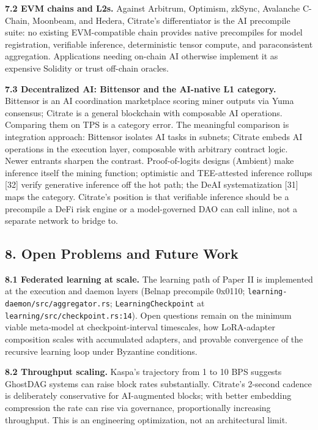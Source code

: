 \textbf{7.2 EVM chains and L2s.} Against Arbitrum, Optimism, zkSync,
Avalanche C-Chain, Moonbeam, and Hedera, Citrate's differentiator is the
AI precompile suite: no existing EVM-compatible chain provides native
precompiles for model registration, verifiable inference, deterministic
tensor compute, and paraconsistent aggregation. Applications needing
on-chain AI otherwise implement it as expensive Solidity or trust
off-chain oracles.

\textbf{7.3 Decentralized AI: Bittensor and the AI-native L1 category.}
Bittensor is an AI coordination marketplace scoring miner outputs via
Yuma consensus; Citrate is a general blockchain with composable AI
operations. Comparing them on TPS is a category error. The meaningful
comparison is integration approach: Bittensor isolates AI tasks in
subnets; Citrate embeds AI operations in the execution layer, composable
with arbitrary contract logic. Newer entrants sharpen the contrast.
Proof-of-logits designs (Ambient) make inference itself the mining
function; optimistic and TEE-attested inference rollups {[}32{]} verify
generative inference off the hot path; the DeAI systematization {[}31{]}
maps the category. Citrate's position is that verifiable inference
should be a precompile a DeFi risk engine or a model-governed DAO can
call inline, not a separate network to bridge to.

\subsection{8. Open Problems and Future
Work}\label{open-problems-and-future-work}

\textbf{8.1 Federated learning at scale.} The learning path of Paper II
is implemented at the execution and daemon layers (Belnap precompile
0x0110; \texttt{learning-daemon/src/aggregator.rs};
\texttt{LearningCheckpoint} at \texttt{learning/src/checkpoint.rs:14}).
Open questions remain on the minimum viable meta-model at
checkpoint-interval timescales, how LoRA-adapter composition scales with
accumulated adapters, and provable convergence of the recursive learning
loop under Byzantine conditions.

\textbf{8.2 Throughput scaling.} Kaspa's trajectory from 1 to 10 BPS
suggests GhostDAG systems can raise block rates substantially. Citrate's
2-second cadence is deliberately conservative for AI-augmented blocks;
with better embedding compression the rate can rise via governance,
proportionally increasing throughput. This is an engineering
optimization, not an architectural limit.

